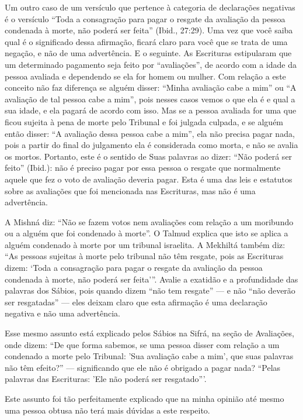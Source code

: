 Um outro caso de um versículo que pertence à categoria de declarações
negativas é o versículo ``Toda a consagração para pagar o resgate da
avaliação da pessoa condenada à morte, não poderá ser feita'' (Ibid.,
27:29). Uma vez que você saiba qual é o significado dessa afirmação,
ficará claro para você que se trata de uma negação, e não de uma
advertência. E o seguinte. As Escrituras estipularam que um determinado
pagamento seja feito por ``avaliações'', de acordo com a idade da pessoa
avaliada e dependendo se ela for homem ou mulher. Com relação a este
conceito não faz diferença se alguém disser: ``Minha avaliação cabe a
mim'' ou ``A avaliação de tal pessoa cabe a mim'', pois nesses casos
vemos o que ela é e qual a sua idade, e ela pagará de acordo com isso.
Mas se a pessoa avaliada for uma que ficou sujeita à pena de morte pelo
Tribunal e foi julgada culpada, e se alguém então disser: ``A avaliação
dessa pessoa cabe a mim'', ela não precisa pagar nada, pois a partir do
final do julgamento ela é considerada como morta, e não se avalia os
mortos. Portanto, este é o sentido de Suas palavras ao dizer: ``Não
poderá ser feito'' (Ibid.): não é preciso pagar por essa pessoa o
resgate que normalmente aquele que fez o voto de avaliação deveria
pagar. Esta é uma das leis e estatutos sobre as avaliações que foi
mencionada nas Escrituras, mas não é uma advertência.

A Mishná diz: ``Não se fazem votos nem avaliações com relação a um
moribundo ou a alguém que foi condenado à morte''. O Talmud explica que
isto se aplica a alguém condenado à morte por um tribunal israelita. A
Mekhiltá também diz: ``As pessoas sujeitas à morte pelo tribunal não têm
resgate, pois as Escrituras dizem: `Toda a consagração para pagar o
resgate da avaliação da pessoa condenada à morte, não poderá ser
feita'''. Avalie a exatidão e a profundidade das palavras dos Sábios,
pois quando dizem ``não tem resgate'' --- e não ``não deverão ser
resgatadas'' --- eles deixam claro que esta afirmação é uma declaração
negativa e não uma advertência.

Esse mesmo assunto está explicado pelos Sábios na Sifrá, na seção de
Avaliações, onde dizem: ``De que forma sabemos, se uma pessoa disser com
relação a um condenado a morte pelo Tribunal: 'Sua avaliação cabe a
mim', que suas palavras não têm efeito?'' --- significando que ele não é
obrigado a pagar nada? ``Pelas palavras das Escrituras: 'Ele não poderá
ser resgatado'''.

Este assunto foi tão perfeitamente explicado que na minha opinião até
mesmo uma pessoa obtusa não terá mais dúvidas a este respeito.


